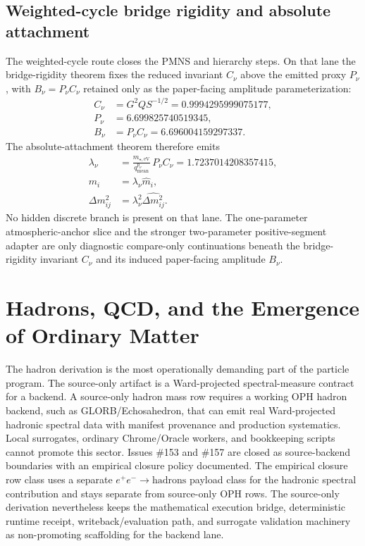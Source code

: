 \documentclass[11pt]{article}
\begin{document}
\subsection{Weighted-cycle bridge rigidity and absolute attachment}

The weighted-cycle route closes the PMNS and hierarchy steps. On that lane the
bridge-rigidity theorem fixes the reduced invariant \(C_\nu\) above the emitted
proxy \(P_\nu\), with \(B_\nu=P_\nu C_\nu\) retained only as the paper-facing
amplitude parameterization:
\[
\begin{aligned}
C_\nu&=G^2Q S^{-1/2}=0.9994295999075177,\\
P_\nu&=6.699825740519345,\\
B_\nu&=P_\nu C_\nu=6.696004159297337.
\end{aligned}
\]
The absolute-attachment theorem therefore emits
\[
\begin{aligned}
\lambda_\nu&=\frac{m_{\star,\mathrm{eV}}}{q_{\mathrm{mean}}^{p_\nu}}\,P_\nu C_\nu=1.7237014208357415,\\
m_i&=\lambda_\nu \hat m_i,\\
\Delta m_{ij}^2&=\lambda_\nu^2\widehat{\Delta m_{ij}^2}.
\end{aligned}
\]
No hidden discrete branch is present on that lane. The one-parameter atmospheric-anchor slice and
the stronger two-parameter positive-segment adapter are only diagnostic compare-only
continuations beneath the bridge-rigidity invariant \(C_\nu\) and its induced paper-facing amplitude \(B_\nu\).

\section{Hadrons, QCD, and the Emergence of Ordinary Matter}

The hadron derivation is the most operationally demanding part of the particle program. The
source-only artifact is a Ward-projected spectral-measure contract for a backend. A source-only
hadron mass row requires a working OPH hadron backend, such as GLORB/Echosahedron, that can emit
real Ward-projected hadronic spectral data with manifest provenance and production systematics.
Local surrogates, ordinary Chrome/Oracle workers, and bookkeeping scripts cannot promote this
sector. Issues \#153 and \#157 are closed as source-backend boundaries with an empirical closure
policy documented. The empirical closure row class uses a separate
\(e^+e^-\to\mathrm{hadrons}\) payload class for the hadronic spectral contribution and stays
separate from source-only OPH rows. The
source-only derivation nevertheless keeps the mathematical execution bridge, deterministic runtime
receipt, writeback/evaluation path,
and surrogate validation machinery as non-promoting scaffolding for the backend lane.
\end{document}
